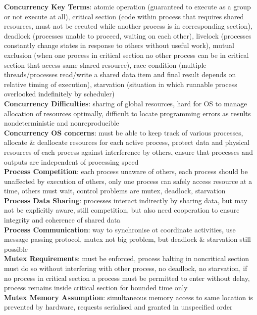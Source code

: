 \documentclass[a4paper]{article}
\begin{document}
\begin{multicols}{2}
        \textbf{Concurrency Key Terms}: atomic operation (guaranteed to execute as a group or not execute at all), critical section (code within process that requires shared resources, must not be eecuted while another process is in corresponding section), deadlock (processes unable to proceed, waiting on each other), livelock (processes constantly change states in response to others without useful work), mutual exclusion (when one process in critical section no other process can be in critical section that access same shared resource), race condition (multiple threads/processes read/write a shared data item and final result depends on relative timing of execution), starvation (situation in which runnable process overlooked indefinitely by scheduler)\\
        \textbf{Concurrency Difficulties}: sharing of global resources, hard for OS to manage allocation of resources optimally, difficult to locate programming errors as results nondeterministic and nonreproducible\\
        \textbf{Concurrency OS concerns}: must be able to keep track of various processes, allocate \& deallocate resources for each active process, protect data and physical resources of each process against interference by others, ensure that processes and outputs are independent of processing speed\\
        \textbf{Process Competition}: each process unaware of others, each process should be unaffected by execution of others, only one process can safely access resource at a time, others must wait, control problems are mutex, deadlock, starvation\\
        \textbf{Process Data Sharing}: processes interact indirectly by sharing data, but may not be explicitly aware, still competition, but also need cooperation to ensure integrity and coherence of shared data\\
        \textbf{Process Communication}: way to synchronise ot coordinate activities, use message passing protocol, mutex not big problem, but deadlock \& starvation still possible\\
        \textbf{Mutex Requirements}: must be enforced, process halting in noncritical section must do so without interfering with other process, no deadlock, no starvation, if no process in critical section a process must be permitted to enter without delay, process remains inside critical section for bounded time only\\
        \textbf{Mutex Memory Assumption}: simultaneous memory access to same location is prevented by hardware, requests serialised and granted in unspecified order\\

\end{multicols}
\end{document}
